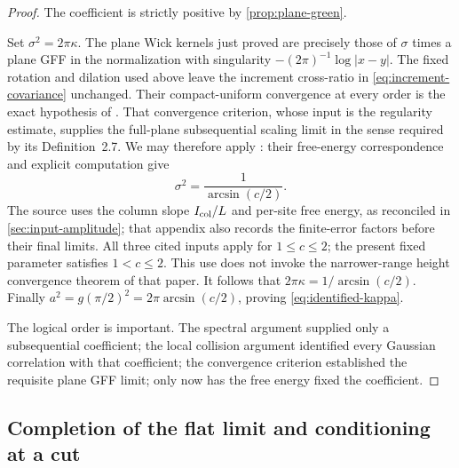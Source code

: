 \begin{proof}
The coefficient is strictly positive by \cref{prop:plane-green}.

Set $\sigma^2=2\pi\kappa$. The plane Wick kernels just proved
are precisely those of $\sigma$ times a plane GFF in the
normalization with singularity $-(2\pi)^{-1}\log|x-y|$.
The fixed rotation and dilation used above leave the increment
cross-ratio in \cref{eq:increment-covariance} unchanged.
Their compact-uniform convergence at every order is the exact
hypothesis of \cite[Theorem~8.1]{DKLM2026}. That convergence
criterion, whose input is the regularity estimate, supplies
the full-plane subsequential scaling limit in the sense required
by its Definition~2.7. We may therefore apply
\cite[Theorems~4.3 and~4.4]{DKLM2026}: their free-energy correspondence
and explicit computation give
\[
                    \sigma^2=\frac1{\arcsin(c/2)}.
\]
The source uses the column slope $I_{\rm col}/L$ and per-site free
energy, as reconciled in \cref{sec:input-amplitude}; that appendix
also records the finite-error factors before their final limits.
All three cited inputs apply for $1\leq c\leq2$; the present
fixed parameter satisfies $1<c\leq2$. This use does not invoke
the narrower-range height convergence theorem of that paper.
It follows that $2\pi\kappa=1/\arcsin(c/2)$. Finally
$a^2=g(\pi/2)^2=2\pi\arcsin(c/2)$, proving
\eqref{eq:identified-kappa}.

The logical order is important. The spectral argument supplied
only a subsequential coefficient; the local collision argument
identified every Gaussian correlation with that coefficient;
the convergence criterion established the requisite plane GFF
limit; only now has the free energy fixed the coefficient.
\end{proof}

\subsection{Completion of the flat limit and conditioning at a cut}

